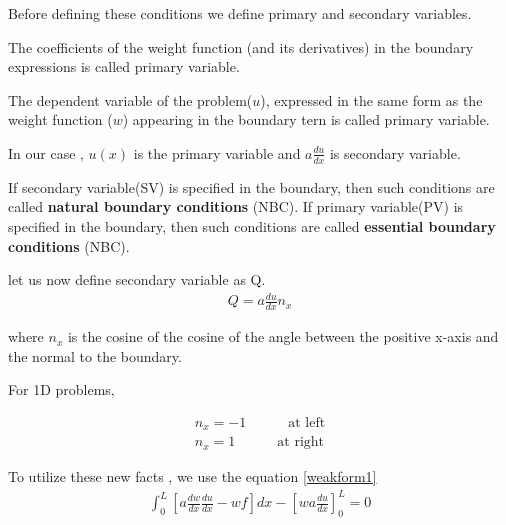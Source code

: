 \begin{itemize}
Before defining these conditions we define primary and secondary variables.

\begin{df}
	The coefficients of the weight function (and its derivatives) in the boundary expressions is called primary variable.
\end{df}

\begin{df}
	The dependent variable of the problem($u$), expressed in the same form as the weight function ($w$) appearing in the boundary tern is called primary variable.
\end{df}

In our case , $u(x)$ is the primary variable and  $ a \frac{du}{dx}$ is secondary variable.

If secondary variable(SV) is specified in the boundary, then such conditions are called \textbf{natural boundary conditions} (NBC).
If primary variable(PV) is specified in the boundary, then such conditions are called \textbf{essential boundary conditions} (NBC).

let us now define secondary variable as Q.
\begin{eqnarray}
	Q = a\frac{du}{dx} n_x
\end{eqnarray}

where $n_x$ is the cosine of the cosine of the angle between the positive x-axis and the normal to the boundary.

For 1D problems,

\begin{eqnarray}
	n_x = -1 \quad\quad\quad \text{at left}\\
	n_x = 1 \quad\quad\quad \text{at right}
\end{eqnarray}

	To utilize these new facts , we use the equation \ref{weakform1}
	\begin{eqnarray}
	\int_{0}^{L} \left[ a \frac{dw}{dx} \frac{du}{dx} - wf \right] dx  - \left[ wa \frac{du}{dx}\right]_0^L = 0
    \end{eqnarray}


\end{itemize}

